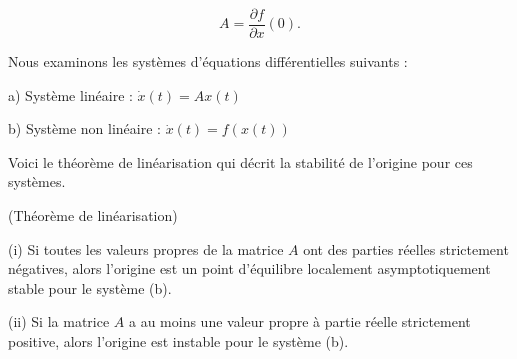 \documentclass[12pt,a4paper]{report}%
\begin{document}
\[ A = \frac{\partial f}{\partial x}(0). \]

Nous examinons les systèmes d'équations différentielles suivants :

a) Système linéaire : \( \dot{x}(t) = A x(t) \)

b) Système non linéaire : \( \dot{x}(t) = f(x(t)) \)

Voici le théorème de linéarisation qui décrit la stabilité de l'origine pour ces systèmes.

\begin{théorème}{(Théorème de linéarisation)}{}
	
	(i) Si toutes les valeurs propres de la matrice \( A \) ont des parties réelles strictement négatives, alors l'origine est un point d'équilibre localement asymptotiquement stable pour le système (b).
	
	(ii) Si la matrice \( A \) a au moins une valeur propre à partie réelle strictement positive, alors l'origine est instable pour le système (b).
\end{théorème}
\end{document}
